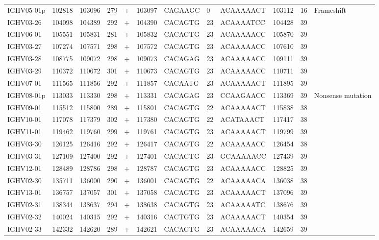 \begin{tabular}{lrrrlrlllrrl}
  IGHV05-01p & 102818 & 103096 & 279 & + & 103097 & CAGAAGC & 0 & ACAAAAACT & 103112 & 16 & Frameshift \\ 
  IGHV03-26 & 104098 & 104389 & 292 & + & 104390 & CACAGTG & 23 & ACAAAATCC & 104428 & 39 &  \\ 
  IGHV06-01 & 105551 & 105831 & 281 & + & 105832 & CACAGTG & 23 & ACAAAAACC & 105870 & 39 &  \\ 
  IGHV03-27 & 107274 & 107571 & 298 & + & 107572 & CACAGTG & 23 & ACAAAAACC & 107610 & 39 &  \\ 
  IGHV03-28 & 108775 & 109072 & 298 & + & 109073 & CACAGAG & 23 & ACAAAAACC & 109111 & 39 &  \\ 
  IGHV03-29 & 110372 & 110672 & 301 & + & 110673 & CACAGTG & 23 & ACAAAAACC & 110711 & 39 &  \\ 
  IGHV07-01 & 111565 & 111856 & 292 & + & 111857 & CACAATG & 23 & ACAAAAACT & 111895 & 39 &  \\ 
  IGHV08-01p & 113033 & 113330 & 298 & + & 113331 & CACAGAG & 23 & CCAAGAACC & 113369 & 39 & Nonsense mutation \\ 
  IGHV09-01 & 115512 & 115800 & 289 & + & 115801 & CACAGTG & 22 & ACAAAAACT & 115838 & 38 &  \\ 
  IGHV10-01 & 117078 & 117379 & 302 & + & 117380 & CACAGTG & 22 & ACATAAACT & 117417 & 38 &  \\ 
  IGHV11-01 & 119462 & 119760 & 299 & + & 119761 & CACAGTG & 23 & ACAAAAACT & 119799 & 39 &  \\ 
  IGHV03-30 & 126125 & 126416 & 292 & + & 126417 & CACAGTG & 22 & ACAAAAACC & 126454 & 38 &  \\ 
  IGHV03-31 & 127109 & 127400 & 292 & + & 127401 & CACAGTG & 23 & GCAAAAACC & 127439 & 39 &  \\ 
  IGHV12-01 & 128489 & 128786 & 298 & + & 128787 & CACAGTG & 23 & ACAAAAACC & 128825 & 39 &  \\ 
  IGHV02-30 & 135711 & 136000 & 290 & + & 136001 & CACAGTG & 22 & ACAAAAACA & 136038 & 38 &  \\ 
  IGHV13-01 & 136757 & 137057 & 301 & + & 137058 & CACAGTG & 23 & ACAAAAACT & 137096 & 39 &  \\ 
  IGHV02-31 & 138344 & 138637 & 294 & + & 138638 & CACAGTG & 23 & ACAAAAATC & 138676 & 39 &  \\ 
  IGHV02-32 & 140024 & 140315 & 292 & + & 140316 & CACTGTG & 23 & ACAAAAACT & 140354 & 39 &  \\ 
  IGHV02-33 & 142332 & 142620 & 289 & + & 142621 & CACAGTG & 23 & ACAAAAACA & 142659 & 39 &  \\ 

\end{tabular}

